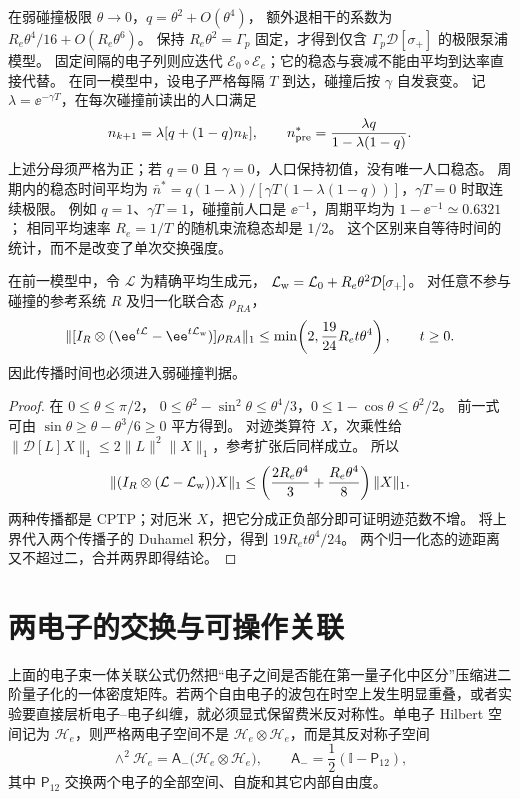 \begin{exbox}
在弱碰撞极限 $\theta\to0$，$q=\theta^2+O(\theta^4)$，
额外退相干的系数为 $R_e\theta^4/16+O(R_e\theta^6)$。
保持 $R_e\theta^2=\Gamma_p$ 固定，才得到仅含 $\Gamma_p\mathcal D[\sigma_+]$ 的极限泵浦模型。
固定间隔的电子列则应迭代 $\mathscr E_0\circ\mathscr E_e$；它的稳态与衰减不能由平均到达率直接代替。
在同一模型中，设电子严格每隔 $T$ 到达，碰撞后按 $\gamma$ 自发衰变。
记 $\lambda=\ee^{-\gamma T}$，在每次碰撞前读出的人口满足
\[
n_{k+1}=\lambda[q+(1-q)n_k],\qquad
n_{\rm pre}^*=\frac{\lambda q}{1-\lambda(1-q)}.
\]
上述分母须严格为正；若 $q=0$ 且 $\gamma=0$，人口保持初值，没有唯一人口稳态。
周期内的稳态时间平均为
$\bar n^*=q(1-\lambda)/[\gamma T(1-\lambda(1-q))]$，$\gamma T=0$ 时取连续极限。
例如 $q=1$、$\gamma T=1$，碰撞前人口是 $\ee^{-1}$，周期平均为 $1-\ee^{-1}\simeq0.6321$；
相同平均速率 $R_e=1/T$ 的随机束流稳态却是 $1/2$。
这个区别来自等待时间的统计，而不是改变了单次交换强度。
\end{exbox}

\begin{proposition}[二能级弱碰撞近似的有限时间误差]
在前一模型中，令 $\mathcal L$ 为精确平均生成元，
$\mathcal L_{\rm w}=\mathcal L_0+R_e\theta^2\mathcal D[\sigma_+]$。
对任意不参与碰撞的参考系统 $R$ 及归一化联合态 $\rho_{RA}$，
\[
\|[I_R\otimes(\ee^{t\mathcal L}-\ee^{t\mathcal L_{\rm w}})]\rho_{RA}\|_1
\le\min\!\left(2,\frac{19}{24}R_et\theta^4\right),\qquad t\ge0.
\]
因此传播时间也必须进入弱碰撞判据。
\end{proposition}
\begin{proof}
在 $0\le\theta\le\pi/2$，
$0\le\theta^2-\sin^2\theta\le\theta^4/3$，$0\le1-\cos\theta\le\theta^2/2$。
前一式可由 $\sin\theta\ge\theta-\theta^3/6\ge0$ 平方得到。
对迹类算符 $X$，次乘性给
$\|\mathcal D[L]X\|_1\le2\|L\|^2\|X\|_1$，参考扩张后同样成立。
所以
\[
\|(I_R\otimes(\mathcal L-\mathcal L_{\rm w}))X\|_1
\le\left(\frac{2R_e\theta^4}{3}+\frac{R_e\theta^4}{8}\right)\|X\|_1.
\]
两种传播都是 CPTP；对厄米 $X$，把它分成正负部分即可证明迹范数不增。
将上界代入两个传播子的 Duhamel 积分，得到 $19R_et\theta^4/24$。
两个归一化态的迹距离又不超过二，合并两界即得结论。
\end{proof}

\section{两电子的交换与可操作关联}

上面的电子束一体关联公式仍然把“电子之间是否能在第一量子化中区分”压缩进二阶量子化的一体密度矩阵。若两个自由电子的波包在时空上发生明显重叠，或者实验要直接层析电子--电子纠缠，就必须显式保留费米反对称性。单电子 Hilbert 空间记为 $\mathcal H_e$，则严格两电子空间不是
$\mathcal H_e\otimes\mathcal H_e$，而是其反对称子空间
\[
\wedge^2\mathcal H_e
=\mathsf A_-\bigl(\mathcal H_e\otimes\mathcal H_e\bigr),
\qquad
\mathsf A_-=\frac12(\mathbb I-\mathsf P_{12}),
\]
其中 $\mathsf P_{12}$ 交换两个电子的全部空间、自旋和其它内部自由度。

